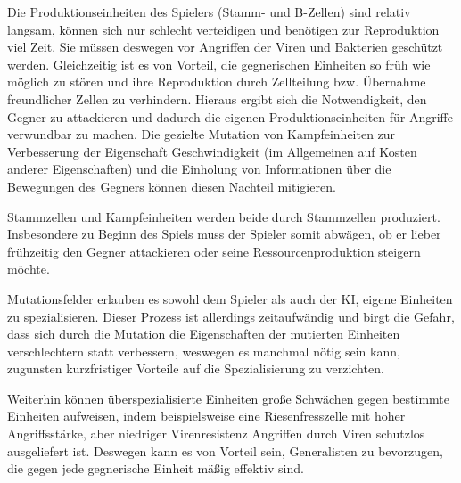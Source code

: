 
Die Produktionseinheiten des Spielers (Stamm- und B-Zellen) sind relativ
langsam, können sich nur schlecht verteidigen und benötigen zur Reproduktion
viel Zeit. Sie müssen deswegen vor Angriffen der Viren und Bakterien geschützt
werden. Gleichzeitig ist es von Vorteil, die gegnerischen Einheiten so früh wie
möglich zu stören und ihre Reproduktion durch Zellteilung bzw. Übernahme
freundlicher Zellen zu verhindern. Hieraus ergibt sich die Notwendigkeit, den
Gegner zu attackieren und dadurch die eigenen Produktionseinheiten für Angriffe
verwundbar zu machen. Die gezielte Mutation von Kampfeinheiten zur Verbesserung
der Eigenschaft Geschwindigkeit (im Allgemeinen auf Kosten anderer
Eigenschaften) und die Einholung von Informationen über die Bewegungen des
Gegners können diesen Nachteil mitigieren.


Stammzellen und Kampfeinheiten werden beide durch Stammzellen produziert.
Insbesondere zu Beginn des Spiels muss der Spieler somit abwägen, ob er
lieber frühzeitig den Gegner attackieren oder seine Ressourcenproduktion
steigern möchte.


Mutationsfelder erlauben es sowohl dem Spieler als auch der KI, eigene
Einheiten zu spezialisieren. Dieser Prozess ist allerdings zeitaufwändig und
birgt die Gefahr, dass sich durch die Mutation die Eigenschaften der mutierten
Einheiten verschlechtern statt verbessern, weswegen es manchmal nötig sein
kann, zugunsten kurzfristiger Vorteile auf die Spezialisierung zu verzichten.

Weiterhin können überspezialisierte Einheiten große Schwächen gegen bestimmte
Einheiten aufweisen, indem beispielsweise eine Riesenfresszelle mit hoher
Angriffsstärke, aber niedriger Virenresistenz Angriffen durch Viren
schutzlos ausgeliefert ist. Deswegen kann es von Vorteil sein, Generalisten zu
bevorzugen, die gegen jede gegnerische Einheit mäßig effektiv sind.
